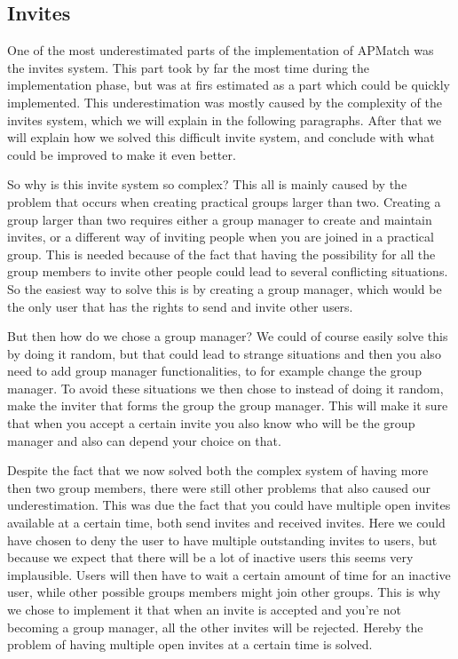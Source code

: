 \subsection{Invites}
One of the most underestimated parts of the implementation of APMatch was the invites system.
This part took by far the most time during the implementation phase, but was at firs estimated as a part which could be quickly implemented.
This underestimation was mostly caused by the complexity of the invites system, which we will explain in the following paragraphs.
After that we will explain how we solved this difficult invite system, and conclude with what could be improved to make it even better.

So why is this invite system so complex?
This all is mainly caused by the problem that occurs when creating practical groups larger than two.
Creating a group larger than two requires either a group manager to create and maintain invites, or a different way of inviting people when you are joined in a practical group.
This is needed because of the fact that having the possibility for all the group members to invite other people could lead to several conflicting situations.
So the easiest way to solve this is by creating a group manager, which would be the only user that has the rights to send and invite other users.

But then how do we chose a group manager?
We could of course easily solve this by doing it random, but that could lead to strange situations and then you also need to add group manager functionalities, to for example change the group manager.
To avoid these situations we then chose to instead of doing it random, make the inviter that forms the group the group manager.
This will make it sure that when you accept a certain invite you also know who will be the group manager and also can depend your choice on that.

Despite the fact that we now solved both the complex system of having more then two group members, there were still other problems that also caused our underestimation.
This was due the fact that you could have multiple open invites available at a certain time, both send invites and received invites.
Here we could have chosen to deny the user to have multiple outstanding invites to users, but because we expect that there will be a lot of inactive users this seems very implausible.
Users will then have to wait a certain amount of time for an inactive user, while other possible groups members might join other groups.
This is why we chose to implement it that when an invite is accepted and you're not becoming a group manager, all the other invites will be rejected.
Hereby the problem of having multiple open invites at a certain time is solved.


